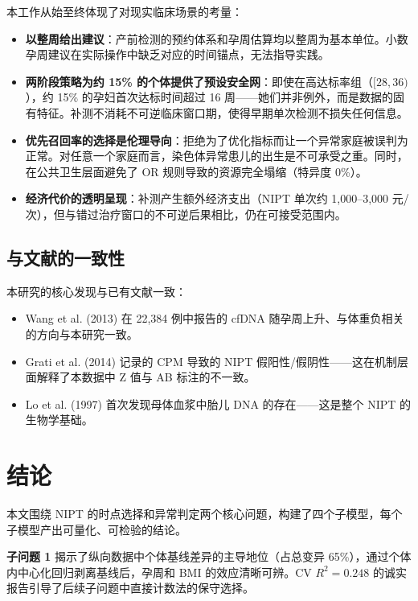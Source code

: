 \documentclass{mcm-paper}
\begin{document}
本工作从始至终体现了对现实临床场景的考量：

\begin{itemize}
    \item \textbf{以整周给出建议}：产前检测的预约体系和孕周估算均以整周为基本单位。小数孕周建议在实际操作中缺乏对应的时间锚点，无法指导实践。
    \item \textbf{两阶段策略为约 15\% 的个体提供了预设安全网}：即使在高达标率组（$[28,36)$），约 15\% 的孕妇首次达标时间超过 16 周——她们并非例外，而是数据的固有特征。补测不消耗不可逆临床窗口期，使得早期单次检测不损失任何信息。
    \item \textbf{优先召回率的选择是伦理导向}：拒绝为了优化指标而让一个异常家庭被误判为正常。对任意一个家庭而言，染色体异常患儿的出生是不可承受之重。同时，在公共卫生层面避免了 OR 规则导致的资源完全塌缩（特异度 0\%）。
    \item \textbf{经济代价的透明呈现}：补测产生额外经济支出（NIPT 单次约 1,000--3,000 元/次），但与错过治疗窗口的不可逆后果相比，仍在可接受范围内。
\end{itemize}

\subsection{与文献的一致性}

本研究的核心发现与已有文献一致：
\begin{itemize}
    \item Wang et al. (2013) 在 22,384 例中报告的 cfDNA 随孕周上升、与体重负相关的方向与本研究一致\cite{wang2013}。
    \item Grati et al. (2014) 记录的 CPM 导致的 NIPT 假阳性/假阴性——这在机制层面解释了本数据中 Z 值与 AB 标注的不一致\cite{grati2014}。
    \item Lo et al. (1997) 首次发现母体血浆中胎儿 DNA 的存在\cite{lo1997}——这是整个 NIPT 的生物学基础。
\end{itemize}

\newpage

\section{结论}

本文围绕 NIPT 的时点选择和异常判定两个核心问题，构建了四个子模型，每个子模型产出可量化、可检验的结论。

\textbf{子问题 1} 揭示了纵向数据中个体基线差异的主导地位（占总变异 65\%），通过个体内中心化回归剥离基线后，孕周和 BMI 的效应清晰可辨。CV $R^2=0.248$ 的诚实报告引导了后续子问题中直接计数法的保守选择。
\end{document}
